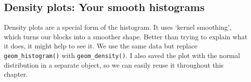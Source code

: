 \documentclass[
  letterpaper,
]{krantz}
\makeatletter
\newenvironment{Shaded}{\begin{snugshade}}{\end{snugshade}}
\newcommand{\AttributeTok}[1]{\textcolor[rgb]{0.40,0.45,0.13}{#1}}
\newcommand{\CommentTok}[1]{\textcolor[rgb]{0.37,0.37,0.37}{#1}}
\newcommand{\DecValTok}[1]{\textcolor[rgb]{0.68,0.00,0.00}{#1}}
\newcommand{\FunctionTok}[1]{\textcolor[rgb]{0.28,0.35,0.67}{#1}}
\newcommand{\NormalTok}[1]{\textcolor[rgb]{0.00,0.23,0.31}{#1}}
\newcommand{\OtherTok}[1]{\textcolor[rgb]{0.00,0.23,0.31}{#1}}
\newcommand{\SpecialCharTok}[1]{\textcolor[rgb]{0.37,0.37,0.37}{#1}}
\newcommand{\StringTok}[1]{\textcolor[rgb]{0.13,0.47,0.30}{#1}}
\newenvironment{kframe}{%
\medskip{}
\setlength{\fboxsep}{.8em}
 \def\at@end@of@kframe{}%
 \ifinner\ifhmode%
  \def\at@end@of@kframe{\end{minipage}}%
  \begin{minipage}{\columnwidth}%
 \fi\fi%
 \def\FrameCommand##1{\hskip\@totalleftmargin \hskip-\fboxsep
 \colorbox{shadecolor}{##1}\hskip-\fboxsep
     \hskip-\linewidth \hskip-\@totalleftmargin \hskip\columnwidth}%
 \MakeFramed {\advance\hsize-\width
   \@totalleftmargin\z@ \linewidth\hsize
   \@setminipage}}%
 {\par\unskip\endMakeFramed%
 \at@end@of@kframe}
\renewenvironment{Shaded}{\begin{kframe}}{\end{kframe}}
\makeatother
\begin{document}
\subsection{Density plots: Your smooth
histograms}\label{density-plots-your-smooth-histograms}

Density plots are a special form of the histogram. It uses `kernel
smoothing', which turns our blocks into a smoother shape. Better than
trying to explain what it does, it might help to see it. We use the same
data but replace \texttt{geom\_histogram()} with
\texttt{geom\_density()}. I also saved the plot with the normal
distribution in a separate object, so we can easily reuse it throughout
this chapter.

\begin{Shaded}
\end{Shaded}
\end{document}
